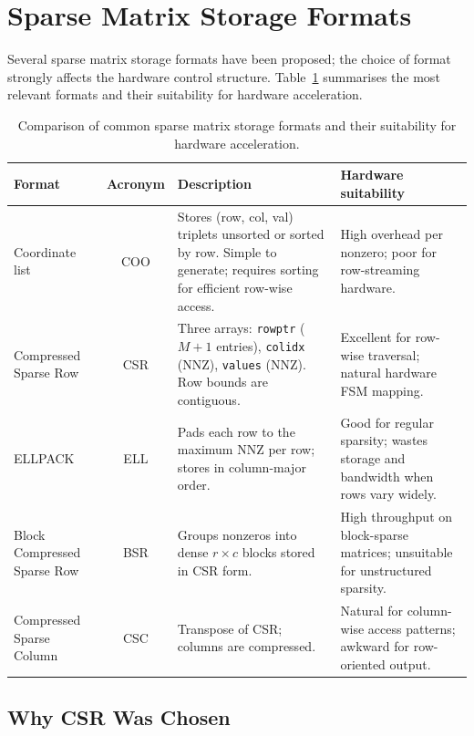 \section{Sparse Matrix Storage Formats}

Several sparse matrix storage formats have been proposed; the choice of format
strongly affects the hardware control structure. Table~\ref{tab:sparse-formats}
summarises the most relevant formats and their suitability for hardware
acceleration.

\begin{table}[htbp]
  \centering
  \small
  \setlength{\tabcolsep}{4pt}
  \begin{tabular}{>{\raggedright\arraybackslash}p{2.6cm}c%
                  >{\raggedright\arraybackslash}p{4.9cm}%
                  >{\raggedright\arraybackslash}p{4.5cm}}
  \toprule
  Format & Acronym & Description & Hardware suitability \\
  \midrule
  Coordinate list & COO &
    Stores (row, col, val) triplets unsorted or sorted by row.
    Simple to generate; requires sorting for efficient row-wise access. &
    High overhead per nonzero; poor for row-streaming hardware. \\[4pt]
  Compressed Sparse Row & CSR &
    Three arrays: \texttt{rowptr} ($M{+}1$ entries), \texttt{colidx} (NNZ),
    \texttt{values} (NNZ). Row bounds are contiguous. &
    Excellent for row-wise traversal; natural hardware FSM mapping. \\[4pt]
  ELLPACK & ELL &
    Pads each row to the maximum NNZ per row; stores in column-major order. &
    Good for regular sparsity; wastes storage and bandwidth when rows vary widely. \\[4pt]
  Block Compressed Sparse Row & BSR &
    Groups nonzeros into dense $r \times c$ blocks stored in CSR form. &
    High throughput on block-sparse matrices; unsuitable for unstructured sparsity. \\[4pt]
  Compressed Sparse Column & CSC &
    Transpose of CSR; columns are compressed. &
    Natural for column-wise access patterns; awkward for row-oriented output. \\
  \bottomrule
  \end{tabular}
  \caption{Comparison of common sparse matrix storage formats and their suitability
           for hardware acceleration.}
  \label{tab:sparse-formats}
\end{table}

\subsection{Why CSR Was Chosen}

